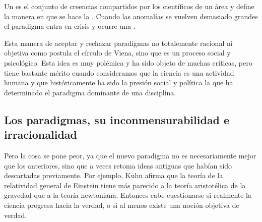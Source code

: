 


\begin{remember}
    \label{rem:paradigma}
    Un  es el conjunto de creencias compartidos por los
    científicos de un área y define la manera en que se hace la
    .
    Cuando las anomalías se vuelven demasiado grandes el paradigma entra
    en crisis y ocurre una .
\end{remember}

Esta manera de aceptar y rechazar paradigmas no totalemente racional ni objetiva
como postula el círculo de Viena, sino que es un proceso social y psicológico.
Esta idea es muy polémica y ha sido objeto de muchas críticas, pero tiene
bastante mérito cuando consideramos que la ciencia es una actividad humana y que
históricamente ha sido la presión social y política la que ha determinado el
paradigma dominante de una disciplina.

\subsection*{Los paradigmas, su inconmensurabilidad e irracionalidad}
Pero la cosa se pone peor, ya que el nuevo paradigma no es necesariamente mejor
que los anteriores, sino que a veces retoma ideas antiguas que habían sido
descartadas previamente.
Por ejemplo, Kuhn afirma que la teoría de la relatividad general de Einstein
tiene más parecido a la teoría aristotélica de la gravedad que a la teoría
newtoniana.
Entonces cabe cuestionarse si realmente la ciencia progresa hacia la verdad, o
si al menos existe una noción objetiva de verdad.

